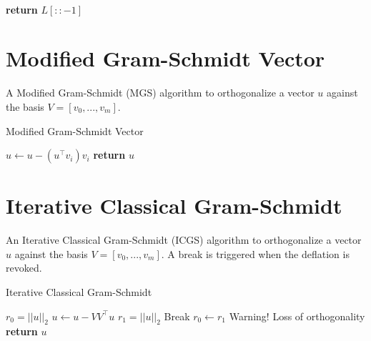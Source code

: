 \documentclass[a4paper]{article}
\begin{document}
\begin{algorithm}
\begin{algorithmic}[1]
    \EndWhile
    
\EndFor



\\
\State \textbf{return} $L[::-1]$


\EndProcedure
\end{algorithmic}
\end{algorithm}




























\pagebreak

\section{Modified Gram-Schmidt Vector}
A Modified Gram-Schmidt (MGS) algorithm to orthogonalize a vector $u$ against the basis $V = [v_0,...,v_m] $. 




\begin{algorithm}
\caption{Modified Gram-Schmidt Vector}\label{alg:MGSV}
\begin{algorithmic}[1]

    \State $ u \gets u - (u^\top v_i) v_i$
\EndFor
\State \textbf{return} $ u $
\EndProcedure
\end{algorithmic}
\end{algorithm}

\section{Iterative Classical Gram-Schmidt}
An Iterative Classical Gram-Schmidt (ICGS) algorithm to orthogonalize a vector $u$ against the basis $V = [v_0,...,v_m] $. A break is triggered when the deflation is revoked.




\begin{algorithm}
\caption{Iterative Classical Gram-Schmidt}\label{alg:MGSV}
\begin{algorithmic}[1]
\State $r_0 = ||u||_2$
    \State $ u \gets u - VV^\top u$
    \State $ r_1 = ||u||_2$
        \State Break
    \EndIf
    \State $r_0 \gets r_1$
\EndFor
{}
\State Warning! Loss of orthogonality
\EndIf
\State \textbf{return} $ u $
\EndProcedure
\end{algorithmic}
\end{algorithm}
\end{document}
